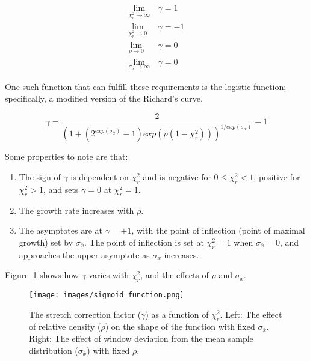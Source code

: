 \begin{align}
    \lim_{\chi_r^2 \to \infty} \, &\gamma = 1 \nonumber \\
    \lim_{\chi_r^2 \to 0} \, &\gamma = -1 \nonumber \\
    \lim_{\rho \to 0} \, &\gamma = 0 \nonumber \\
    \lim_{\sigma_{\bar{x}} \to \infty} \, &\gamma = 0
    \label{eq:equation55}
\end{align}

One such function that can fulfill these requirements is the logistic function;
specifically, a modified version of the Richard's curve.

\begin{equation}
    \gamma = \frac{2}
             {\left(
                 {1 + (2^{exp(\sigma_{\bar{x}})} - 1)
                 exp(\rho (1 - \chi_r^2))}
             \right)^{1/exp(\sigma_{\bar{x}})}} - 1
    \label{eq:equation56}
\end{equation}

Some properties to note are that:

\begin{enumerate}
    \item{The sign of $\gamma$ is dependent on $\chi_r^2$ and is negative for
    $0 \leq \chi_r^2 < 1$, positive for $\chi_r^2 > 1$, and sets $\gamma=0$ at $\chi_r^2=1$.}
    \item{The growth rate increases with $\rho$.}
    \item{The asymptotes are at $\gamma=\pm1$, with the point of inflection
    (point of maximal growth) set by $\sigma_{\bar{x}}$.  The point of
    inflection is set at $\chi_r^2=1$ when $\sigma_{\bar{x}} = 0$, and
    approaches the upper asymptote as $\sigma_{\bar{x}}$ increases.}
\end{enumerate}

Figure~\ref{fig:sigmoid-function} shows how $\gamma$ varies with $\chi_r^2$,
and the effects of $\rho$ and $\sigma_{\bar{x}}$.

\begin{figure}[H]
  \begin{center}
  \texttt{[image: images/sigmoid\_function.png]}
  \caption{The stretch correction factor ($\gamma$) as a function of $\chi_r^2$.
           Left: The effect of relative density ($\rho$) on the shape of the
           function with fixed $\sigma_{\bar{x}}$.  Right: The effect of
           window deviation from the mean sample distribution
           ($\sigma_{\bar{x}}$) with fixed $\rho$.}
  \label{fig:sigmoid-function}
  \end{center}
\end{figure}

